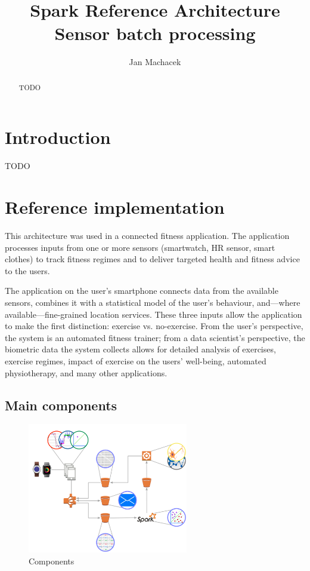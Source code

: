 \documentclass[a4paper, 10 pt, conference]{IEEEtran}
\title{Spark Reference Architecture \\ Sensor batch processing}
\author{Jan Machacek%
}
\begin{document}
\maketitle
\thispagestyle{empty}
\pagestyle{empty}

\begin{abstract}

TODO

\end{abstract}


\section{Introduction}

TODO

\section{Reference implementation}

This architecture was used in a connected fitness application. The application processes inputs from one or more sensors (smartwatch, HR sensor, smart clothes) to track fitness regimes and to deliver targeted health and fitness advice to the users. 

The application on the user's smartphone connects data from the available sensors, combines it with a statistical model of the user's behaviour, and---where available---fine-grained location services. These three inputs allow the application to make the first distinction: exercise vs. no-exercise. From the user's perspective, the system is an automated fitness trainer; from a data scientist's perspective, the biometric data the system collects allows for detailed analysis of exercises, exercise regimes, impact of exercise on the users' well-being, automated physiotherapy, and many other applications.

\subsection{Main components}

\begin{figure}[hb]
	\begin{center}
		\caption{Components}
		\label{fig:components}
		\includegraphics[width=7cm,keepaspectratio]{ri-arch.png}
	\end{center}
\end{figure}
\end{document}
